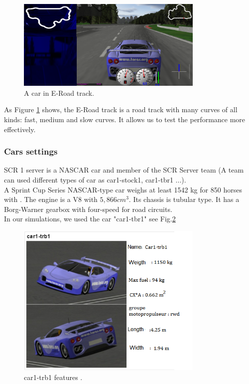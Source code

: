\documentclass{llncs}
\begin{document}
\begin{figure}[h!]
	
	\centering
	\includegraphics[width=0.8\textwidth]{fig/Eroad.png}
	\begin{minipage}{10cm}
		\centering
		\caption{\footnotesize A car in E-Road track.}
		\label{fig30}
	\end{minipage} 
	
\end{figure}
As Figure \ref{fig30} shows, the E-Road track is a road track with many curves of all kinds: fast, medium and slow curves. It allows us to test the performance more effectively.


\subsubsection{ Cars settings}

SCR 1 server is a NASCAR car and member of the SCR Server team (A team can used different types of car as  car1-stock1, car1-tbr1 ...).\\
A Sprint Cup Series NASCAR-type car weighs at least 1542 kg for 850 horses with . The engine is a V8 with  $ 5,866 cm ^ 3 $. Its chassis is tubular type. It has a Borg-Warner gearbox with four-speed for road circuits.\\

In our simulations, we used the car "car1-tbr1" see Fig.\ref{car} 
\begin{figure}[h!]
	
	\centering
	\includegraphics[width=0.8\textwidth]{fig/car1.png}
	\begin{minipage}{10cm}
		\centering
		\caption{\footnotesize car1-trb1 features  .}
		\label{car}
	\end{minipage} 
	
\end{figure}
\end{document}
